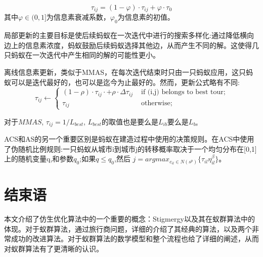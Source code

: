\documentclass[10pt,a4paper,twocolumn,twoside,UTF8]{ctexart}
\begin{document}
	\begin{equation}
	\tau_{ij}=(1-\varphi)\cdot\tau_{ij}+\varphi\cdot\tau_{0}
	\end{equation}	
	其中$\varphi\in(0,1]$为信息素衰减系数，$\varphi_0$为信息素的初值。
	
	局部更新的主要目标是使后续蚂蚁在一次迭代中进行的搜索多样化:通过降低横向边上的信息素浓度，蚂蚁鼓励后续蚂蚁选择其他边，从而产生不同的解。这使得几只蚂蚁在一次迭代中产生相同的解的可能性更小。
	
	离线信息素更新，类似于MMAS，在每次迭代结束时只由一只蚂蚁应用，这只蚂蚁可以是迭代最好的，也可以是迄今为止最好的。然而，更新公式略有不同:
	\begin{equation}
	\tau_{ij}\leftarrow
	\begin{cases}
	(1-\rho) \cdot \tau_{ij} \cdot + \rho \cdot \Delta\tau_{ij} & \text{ if (i,j) belongs to best tour;} \\
	\tau_{ij} & \text{ otherwise; } 
	\end{cases}
	\end{equation}	
	
	对于$MMAS$, $\tau_{ij}= 1/L_{best} $,  $L_{best}$的取值也是要么是$L_{ib}$要么是$L_{bs}$
	
	ACS和AS的另一个重要区别是蚂蚁在建造过程中使用的决策规则。在ACS中使用了伪随机比例规则:一只蚂蚁从城市i到城市j的转移概率取决于一个均匀分布在[0,1]上的随机变量q,和参数$q_0$;如果$q\leq q_0$,然后 $j = arg max_{c_{il}\in N(s^p)} \{   \tau_{il}\eta_{il}^ \beta \} $。	
\section{结束语}
	本文介绍了仿生优化算法中的一个重要的概念：Stigmergy以及其在蚁群算法中的体现。对于蚁群算法，通过旅行商问题，详细的介绍了其经典的算法，以及两个非常成功的改进算法。对于蚁群算法的数学模型和整个流程也给了详细的阐述，从而对蚁群算法有了更清晰的认识。
	
	
\end{document}
